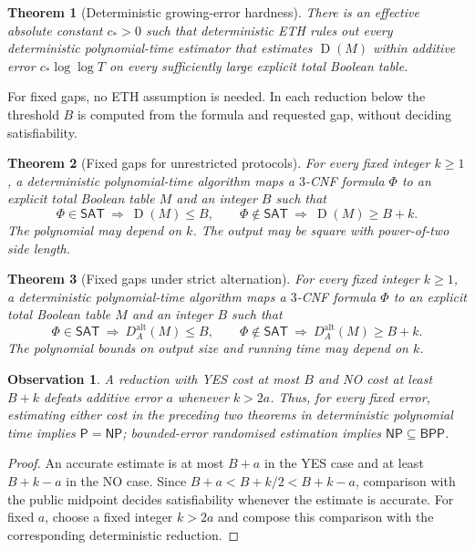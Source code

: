 \documentclass[11pt]{article} \usepackage[utf8]{inputenc}
\theoremstyle{plain} \newtheorem{theorem}{Theorem}[section]
\newtheorem{observation}[observation]{Observation}
\theoremstyle{definition} \newaliascnt{definition}{theorem}
\newcommand{\D}{\operatorname{D}}
\newcommand{\NP}{\mathsf{NP}}
\newcommand{\BPP}{\mathsf{BPP}}
\newcommand{\SAT}{\mathsf{SAT}}
\begin{document}
\begin{theorem}[Deterministic growing-error hardness]
\label{det:eth}
There is an effective absolute constant $c_*>0$ such that deterministic ETH
rules out every deterministic polynomial-time estimator that estimates
$\D(M)$ within additive error $c_*\log\log T$ on every sufficiently large
explicit total Boolean table.
\end{theorem}

For fixed gaps, no ETH assumption is needed. In each reduction below the
threshold $B$ is computed from the formula and requested gap, without
deciding satisfiability.

\begin{theorem}[Fixed gaps for unrestricted protocols]
\label{intro:deterministic}
For every fixed integer $k\ge1$, a deterministic polynomial-time algorithm
maps a $3$-CNF formula $\Phi$ to an explicit total Boolean table $M$ and an
integer $B$ such that
\[
\Phi\in\SAT\ \Longrightarrow\ \D(M)\le B,\qquad
\Phi\notin\SAT\ \Longrightarrow\ \D(M)\ge B+k.
\]
The polynomial may depend on $k$. The output may be square with
power-of-two side length.
\end{theorem}

\begin{theorem}[Fixed gaps under strict alternation]
\label{yao:main}
For every fixed integer $k\ge1$, a deterministic polynomial-time algorithm
maps a $3$-CNF formula $\Phi$ to an explicit total Boolean table $M$ and an
integer $B$ such that
\[
\Phi\in\SAT\ \Longrightarrow\ D_A^{\mathrm{alt}}(M)\le B,\qquad
\Phi\notin\SAT\ \Longrightarrow\ D_A^{\mathrm{alt}}(M)\ge B+k.
\]
The polynomial bounds on output size and running time may depend on $k$.
\end{theorem}

\begin{observation}\label{obs:gap-estimation}
A reduction with YES cost at most $B$ and NO cost at least $B+k$ defeats
additive error $a$ whenever $k>2a$. Thus, for every fixed error, estimating
either cost in the preceding two theorems in deterministic polynomial time
implies $\mathsf P=\NP$; bounded-error randomised estimation implies
$\NP\subseteq\BPP$.
\end{observation}
\begin{proof}
An accurate estimate is at most $B+a$ in the YES case and at least $B+k-a$
in the NO case. Since $B+a<B+k/2<B+k-a$, comparison with the public
midpoint decides satisfiability whenever the estimate is accurate. For
fixed $a$, choose a fixed integer $k>2a$ and compose this comparison with
the corresponding deterministic reduction.
\end{proof}
\end{document}
